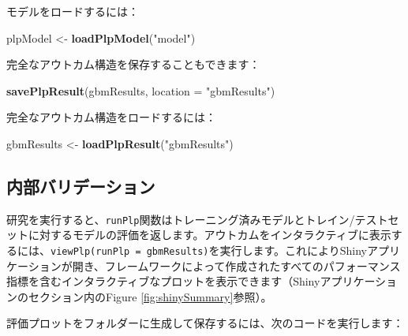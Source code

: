 \documentclass[
  11pt]{book}
\newenvironment{Shaded}{\begin{snugshade}}{\end{snugshade}}
\newcommand{\AttributeTok}[1]{\textcolor[rgb]{0.13,0.29,0.53}{#1}}
\newcommand{\FunctionTok}[1]{\textcolor[rgb]{0.13,0.29,0.53}{\textbf{#1}}}
\newcommand{\NormalTok}[1]{#1}
\newcommand{\OtherTok}[1]{\textcolor[rgb]{0.56,0.35,0.01}{#1}}
\newcommand{\SpecialCharTok}[1]{\textcolor[rgb]{0.81,0.36,0.00}{\textbf{#1}}}
\newcommand{\StringTok}[1]{\textcolor[rgb]{0.31,0.60,0.02}{#1}}
\theoremstyle{definition}
\theoremstyle{definition}
\theoremstyle{definition}
\theoremstyle{definition}
\theoremstyle{remark}
\begin{document}
\begin{Shaded}
\end{Shaded}

モデルをロードするには：

\begin{Shaded}
\begin{Highlighting}[]
\NormalTok{plpModel }\OtherTok{\textless{}{-}} \FunctionTok{loadPlpModel}\NormalTok{(}\StringTok{"model"}\NormalTok{)}
\end{Highlighting}
\end{Shaded}

完全なアウトカム構造を保存することもできます：

\begin{Shaded}
\begin{Highlighting}[]
\FunctionTok{savePlpResult}\NormalTok{(gbmResults, }\AttributeTok{location =} \StringTok{"gbmResults"}\NormalTok{)}
\end{Highlighting}
\end{Shaded}

完全なアウトカム構造をロードするには：

\begin{Shaded}
\begin{Highlighting}[]
\NormalTok{gbmResults }\OtherTok{\textless{}{-}} \FunctionTok{loadPlpResult}\NormalTok{(}\StringTok{"gbmResults"}\NormalTok{)}
\end{Highlighting}
\end{Shaded}

\subsection{内部バリデーション}\label{ux5185ux90e8ux30d0ux30eaux30c7ux30fcux30b7ux30e7ux30f3}

研究を実行すると、\texttt{runPlp}関数はトレーニング済みモデルとトレイン/テストセットに対するモデルの評価を返します。アウトカムをインタラクティブに表示するには、\texttt{viewPlp(runPlp\ =\ gbmResults)}を実行します。これによりShinyアプリケーションが開き、フレームワークによって作成されたすべてのパフォーマンス指標を含むインタラクティブなプロットを表示できます（Shinyアプリケーションのセクション内のFigure \ref{fig:shinySummary}参照）。

評価プロットをフォルダーに生成して保存するには、次のコードを実行します：
\end{document}
